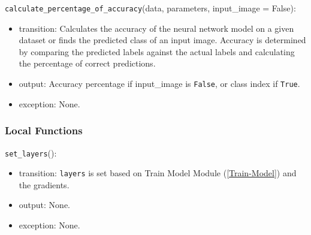 \documentclass[12pt, titlepage]{article}
\def\code#1{\texttt{#1}}
\begin{document}
\noindent \code{calculate\_percentage\_of\_accuracy}(data, parameters, input\_image = False):
\begin{itemize}
  \item transition: Calculates the accuracy of the neural network model on a given dataset or 
  finds the predicted class of an input image.
  Accuracy is determined by comparing the predicted labels against the actual labels and 
   calculating the percentage of correct predictions.
  \item output: Accuracy percentage if input\_image is \code{False}, or class index if \code{True}.
  \item exception: None.
\end{itemize}


\subsubsection{Local Functions}
\noindent \code{set\_layers}():
\begin{itemize}
  \item transition: \code{layers} is set based on Train Model Module (\ref{Train-Model}) 
  and the gradients.
  \item output: None.
  \item exception: None.
\end{itemize}
\end{document}
